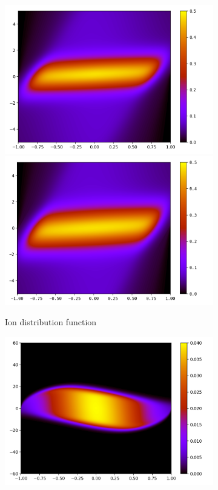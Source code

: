 \documentclass{article}
\numberwithin{equation}{section}
\newcommand{\imh}{\textheight} %
\newcommand{\imw}{\textwidth} %
\begin{document}
\begin{figure}
	\begin{subfigure}{\textwidth}
		\centering
		\includegraphics[height=\imh,width=\imw]{images/fiT0p1_FD.png}
		\includegraphics[height=\imh,width=\imw]{images/fiT0p1.png}
		\caption{Ion distribution function}
		\label{subfig:compT01_ion}
	\end{subfigure}
	\begin{subfigure}{\textwidth}
		\centering
		\includegraphics[height=\imh,width=\imw]{images/feT0p1_FD.png}

\end{subfigure}
\end{figure}
\end{document}
